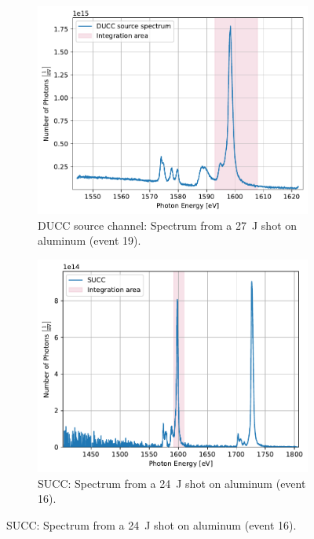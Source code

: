 \begin{figure} [H]
	\centering
	\begin{subfigure}[t]{0.49\textwidth}
		\centering
		\includegraphics[width=\textwidth]{Data_Analysis/converison_efficiency/spectra_of_Al_event_19_on_DUCC_source_spectrum.pdf}
		\caption{DUCC source channel: Spectrum from a \SI{27}{\joule} shot on aluminum (event 19).}
		\label{}
	\end{subfigure}%
	\hfill
	\begin{subfigure}[t]{0.49\textwidth}
		\centering
		\includegraphics[width=\textwidth]{Data_Analysis/converison_efficiency/spectra_of_Al_(thick)_event_16_on_SUCC.pdf}
		\caption{SUCC: Spectrum from a \SI{24}{\joule} shot on aluminum (event 16).}

\end{subfigure}
\end{figure}
